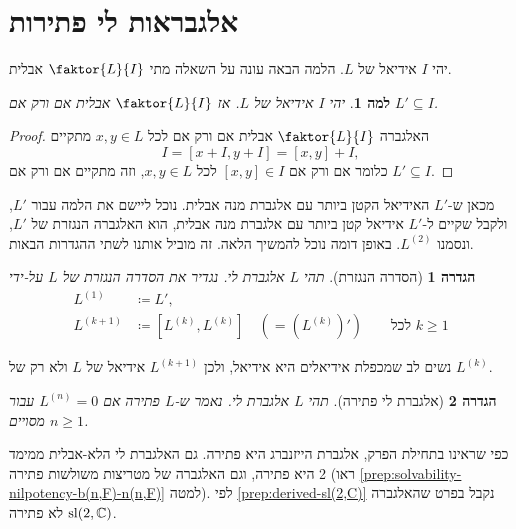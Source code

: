 \documentclass{report}
\theoremstyle{break}
\newtheorem{lemma}[lemma]{למה}
\newtheorem{definition}[definition]{הגדרה}
\theoremstyle{MyNonumberbreak}
\newtheorem{proof}{הוכחה}
\begin{document}
\section{אלגבראות לי פתירות}
יהי $I$ אידיאל של $L$. הלמה הבאה עונה על השאלה מתי $\faktor{L}{I}$ אבלית.
\begin{lemma} \label{lemma:abelian-quotient}
	יהי $I$ אידיאל של $L$. אז $\faktor{L}{I}$ אבלית אם ורק אם $L' \subseteq I$.
\end{lemma}
\begin{proof}
	האלגברה $\faktor{L}{I}$ אבלית אם ורק אם לכל $x, y \in L$ מתקיים
	\[ I = [x + I, y + I] = [x, y] + I, \]
	כלומר אם ורק אם $[x, y] \in I$ לכל $x, y \in L$, וזה מתקיים אם ורק אם $L' \subseteq I$.
\end{proof}
מכאן ש-$L'$ האידיאל הקטן ביותר עם אלגברת מנה אבלית. נוכל ליישם את הלמה עבור $L'$, ולקבל שקיים ל-$L'$ אידיאל קטן ביותר עם אלגברת מנה אבלית, הוא האלגברה הנגזרת של $L'$, ונסמנו $L^{(2)}$. באופן דומה נוכל להמשיך הלאה. זה מוביל אותנו לשתי ההגדרות הבאות.
\begin{definition}[הסדרה הנגזרת] \label{def:derived-series}
	תהי $L$ אלגברת לי. נגדיר את \textit{הסדרה הנגזרת} של $L$ על-ידי
	\begin{align*}
		L^{(1)} &\coloneqq L', \\
		L^{(k+1)} &\coloneqq [L^{(k)}, L^{(k)}] \quad (= (L^{(k)})') \qquad \text{לכל $k \ge 1$}
	\end{align*}
\end{definition}
נשים לב שמכפלת אידיאלים היא אידיאל, ולכן $L^{(k+1)}$ אידיאל של $L$ ולא רק של $L^{(k)}$.
\begin{definition}[אלגברת לי פתירה] \label{def:solvable}
	תהי $L$ אלגברת לי. נאמר ש-$L$ \textit{פתירה} אם $L^{(n)} = 0$ עבור $n \ge 1$ מסויים.
\end{definition}
כפי שראינו בתחילת הפרק, אלגברת הייזנברג היא פתירה. גם האלגברת לי הלא-אבלית ממימד 2 היא פתירה, וגם האלגברה של מטריצות משולשות פתירה (ראו \autoref*{prep:solvability-nilpotency-b(n,F)-n(n,F)} למטה). לפי \autoref*{prep:derived-sl(2,C)} נקבל בפרט שהאלגברה $\operatorname{sl}(2, \operatorname{\mathbb{C}})$ לא פתירה.
\end{document}
